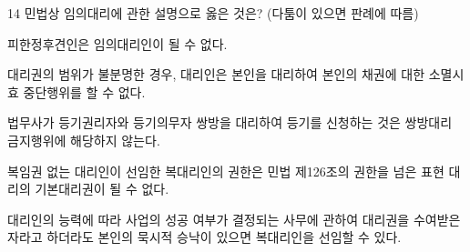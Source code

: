 \begin{question}{14}
민법상 임의대리에 관한 설명으로 옳은 것은? (다툼이 있으면 판례에 따름)
\begin{choices}
  \item 피한정후견인은 임의대리인이 될 수 없다.
  \item 대리권의 범위가 불분명한 경우, 대리인은 본인을 대리하여 본인의 채권에 대한 소멸시효 중단행위를 할 수 없다.
  \item 법무사가 등기권리자와 등기의무자 쌍방을 대리하여 등기를 신청하는 것은 쌍방대리 금지행위에 해당하지 않는다.
  \item 복임권 없는 대리인이 선임한 복대리인의 권한은 민법 제126조의 권한을 넘은 표현 대리의 기본대리권이 될 수 없다.
  \item 대리인의 능력에 따라 사업의 성공 여부가 결정되는 사무에 관하여 대리권을 수여받은 자라고 하더라도 본인의 묵시적 승낙이 있으면 복대리인을 선임할 수 있다.
\end{choices}
\end{question}
